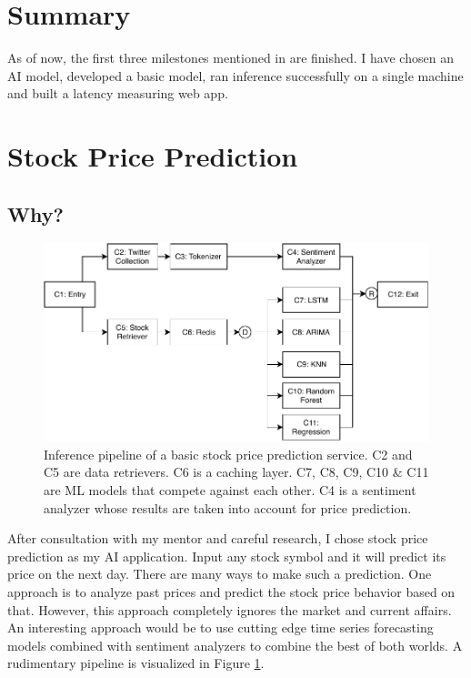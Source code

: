 \documentclass{report}
\begin{document}
\section{Summary}
As of now, the first three milestones mentioned in  are finished. I have chosen an AI model, developed a basic model, ran inference successfully on a single machine and built a latency measuring web app.

\section{Stock Price Prediction}
\subsection{Why?}
\begin{figure}
  \centering
  \includegraphics[width=\textwidth]{StockPriceServiceBasic.pdf}
  \caption{Inference pipeline of a basic stock price prediction service. C2 and C5 are data retrievers. C6 is a caching layer. C7, C8, C9, C10 \& C11 are ML models that compete against each other. C4 is a sentiment analyzer whose results are taken into account for price prediction.}
  \label{fig:StockPriceServiceBasic}
\end{figure}

After consultation with my mentor and careful research, I chose stock price prediction as my AI application. Input any stock symbol and it will predict its price on the next day. There are many ways to make such a prediction. One approach is to analyze past prices and predict the stock price behavior based on that. However, this approach completely ignores the market and current affairs. An interesting approach would be to use cutting edge time series forecasting models combined with sentiment analyzers to combine the best of both worlds. A rudimentary pipeline is visualized in Figure \ref{fig:StockPriceServiceBasic}.
\end{document}
